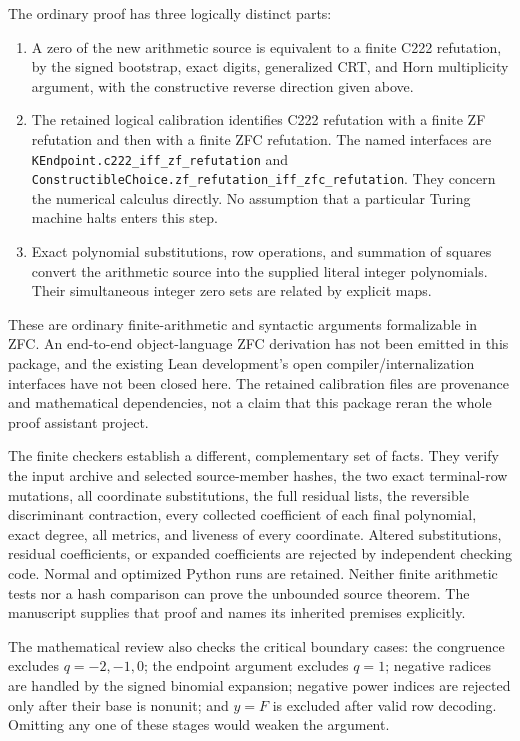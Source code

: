 \documentclass[11pt]{article}
\newcommand{\file}[1]{\nolinkurl{#1}}
\theoremstyle{remark}\newtheorem{remark}[theorem]{Remark}
\begin{document}
The ordinary proof has three logically distinct parts:
\begin{enumerate}
\item A zero of the new arithmetic source is equivalent to a finite
C222 refutation, by the signed bootstrap, exact digits, generalized
CRT, and Horn multiplicity argument, with the constructive reverse
direction given above.
\item The retained logical calibration identifies C222 refutation
with a finite ZF refutation and then with a finite ZFC refutation.
The named interfaces are
\file{KEndpoint.c222_iff_zf_refutation} and
\file{ConstructibleChoice.zf_refutation_iff_zfc_refutation}.
They concern the numerical calculus directly. No assumption that a
particular Turing machine halts enters this step.
\item Exact polynomial substitutions, row operations, and summation
of squares convert the arithmetic source into the supplied literal
integer polynomials. Their simultaneous integer zero sets are related
by explicit maps.
\end{enumerate}

These are ordinary finite-arithmetic and syntactic arguments
formalizable in ZFC. An end-to-end object-language ZFC derivation has
not been emitted in this package, and the existing Lean development's
open compiler/internalization interfaces have not been closed here.
The retained calibration files are provenance and mathematical
dependencies, not a claim that this package reran the whole proof
assistant project.

The finite checkers establish a different, complementary set of facts.
They verify the input archive and selected source-member hashes,
the two exact terminal-row mutations, all coordinate substitutions,
the full residual lists, the reversible discriminant contraction,
every collected coefficient of each final polynomial, exact degree,
all metrics, and liveness of every coordinate. Altered substitutions,
residual coefficients, or expanded coefficients are rejected by
independent checking code. Normal and optimized Python runs are retained.
Neither finite arithmetic tests nor a hash comparison can prove the
unbounded source theorem. The manuscript supplies that proof and
names its inherited premises explicitly.

The mathematical review also checks the critical boundary cases:
the congruence excludes $q=-2,-1,0$; the endpoint argument excludes
$q=1$; negative radices are handled by the signed binomial expansion;
negative power indices are rejected only after their base is nonunit;
and $y=F$ is excluded after valid row decoding. Omitting any one of
these stages would weaken the argument.
\end{document}
